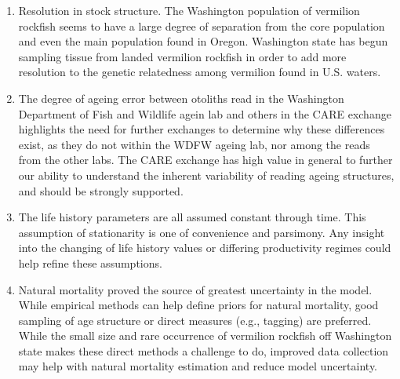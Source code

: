 \documentclass[11pt,
  english,
  a4paper,
]{article}
\begin{document}
\leavevmode\tagmcend\tagstructend


\begin{enumerate}
\def\labelenumi{\arabic{enumi}.}
\item

  Resolution in stock structure. The Washington population of vermilion rockfish seems to have a large degree of separation from the core population and even the main population found in Oregon. Washington state has begun sampling tissue from landed vermilion rockfish in order to add more resolution to the genetic relatedness among vermilion found in U.S. waters.

  \tagmcend\tagstructend\tagstructend
\item

  The degree of ageing error between otoliths read in the Washington Department of Fish and Wildlife agein lab and others in the CARE exchange highlights the need for further exchanges to determine why these differences exist, as they do not within the WDFW ageing lab, nor among the reads from the other labs. The CARE exchange has high value in general to further our ability to understand the inherent variability of reading ageing structures, and should be strongly supported.

  \tagmcend\tagstructend\tagstructend
\item

  The life history parameters are all assumed constant through time. This assumption of stationarity is one of convenience and parsimony. Any insight into the changing of life history values or differing productivity regimes could help refine these assumptions.

  \tagmcend\tagstructend\tagstructend
\item

  Natural mortality proved the source of greatest uncertainty in the model. While empirical methods can help define priors for natural mortality, good sampling of age structure or direct measures (e.g., tagging) are preferred. While the small size and rare occurrence of vermilion rockfish off Washington state makes these direct methods a challenge to do, improved data collection may help with natural mortality estimation and reduce model uncertainty.


\end{enumerate}
\end{document}
